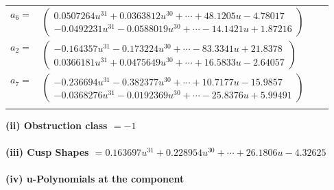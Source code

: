\documentclass[1p]{elsarticle_modified}
\theoremstyle{definition}
\begin{document}
\begin{tabular}{m{7pt} m{180pt} m{7pt} m{180pt} }
\flushright $a_{6}=$&$\begin{pmatrix}0.0507264 u^{31}+0.0363812 u^{30}+\cdots+48.1205 u-4.78017\\-0.0492231 u^{31}-0.0588019 u^{30}+\cdots-14.1421 u+1.87216\end{pmatrix}$ \\
\flushright $a_{2}=$&$\begin{pmatrix}-0.164357 u^{31}-0.173224 u^{30}+\cdots-83.3341 u+21.8378\\0.0366181 u^{31}+0.0475649 u^{30}+\cdots+16.5833 u-2.64057\end{pmatrix}$ \\
\flushright $a_{7}=$&$\begin{pmatrix}-0.236694 u^{31}-0.382377 u^{30}+\cdots+10.7177 u-15.9857\\-0.0368276 u^{31}-0.0192369 u^{30}+\cdots-25.8376 u+5.99491\end{pmatrix}$\\&\end{tabular}
\flushleft \textbf{(ii) Obstruction class $= -1$}\\~\\
\flushleft \textbf{(iii) Cusp Shapes $= 0.163697 u^{31}+0.228954 u^{30}+\cdots+26.1806 u-4.32625$}\\~\\
\newpage\renewcommand{\arraystretch}{1}
\flushleft \textbf{(iv) u-Polynomials at the component}\newline \\
\end{document}
